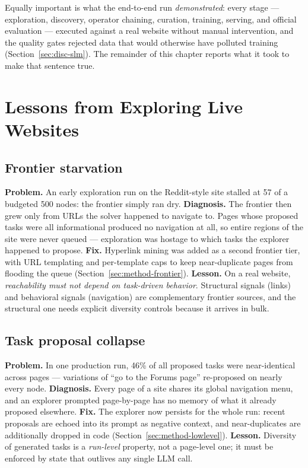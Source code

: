 Equally important is what the end-to-end run \emph{demonstrated}: every stage
--- exploration, discovery, operator chaining, curation, training, serving,
and official evaluation --- executed against a real website without manual
intervention, and the quality gates rejected data that would otherwise have
polluted training (Section~\ref{sec:disc-slm}). The remainder of this chapter
reports what it took to make that sentence true.

\section{Lessons from Exploring Live Websites}
\label{sec:disc-exploration}

\subsection{Frontier starvation}

\textbf{Problem.} An early exploration run on the Reddit-style site stalled
at 57 of a budgeted 500 nodes: the frontier simply ran dry.
\textbf{Diagnosis.} The frontier then grew only from URLs the solver happened
to navigate to. Pages whose proposed tasks were all informational produced no
navigation at all, so entire regions of the site were never queued ---
exploration was hostage to which tasks the explorer happened to propose.
\textbf{Fix.} Hyperlink mining was added as a second frontier tier, with URL
templating and per-template caps to keep near-duplicate pages from flooding
the queue (Section~\ref{sec:method-frontier}).
\textbf{Lesson.} On a real website, \emph{reachability must not depend on
task-driven behavior}. Structural signals (links) and behavioral signals
(navigation) are complementary frontier sources, and the structural one needs
explicit diversity controls because it arrives in bulk.

\subsection{Task proposal collapse}

\textbf{Problem.} In one production run, 46\% of all proposed tasks were
near-identical across pages --- variations of ``go to the Forums page''
re-proposed on nearly every node.
\textbf{Diagnosis.} Every page of a site shares its global navigation menu,
and an explorer prompted page-by-page has no memory of what it already
proposed elsewhere.
\textbf{Fix.} The explorer now persists for the whole run: recent proposals
are echoed into its prompt as negative context, and near-duplicates are
additionally dropped in code (Section~\ref{sec:method-lowlevel}).
\textbf{Lesson.} Diversity of generated tasks is a \emph{run-level} property,
not a page-level one; it must be enforced by state that outlives any single
LLM call.

